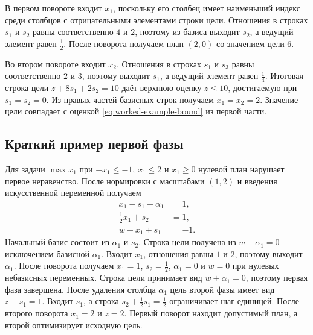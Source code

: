 В первом повороте входит $x_1$, поскольку его столбец имеет
наименьший индекс среди столбцов с отрицательными элементами строки
цели. Отношения в строках $s_1$ и $s_2$ равны соответственно $4$ и $2$,
поэтому из базиса выходит $s_2$, а ведущий элемент равен $\tfrac12$.
После поворота получаем план $(2,0)$ со значением цели $6$.

Во втором повороте входит $x_2$. Отношения в строках $s_1$ и $s_3$
равны соответственно $2$ и $3$, поэтому выходит $s_1$, а ведущий
элемент равен $\tfrac14$. Итоговая строка цели
$z+8s_1+2s_2=10$ даёт верхнюю оценку $z\leq10$, достигаемую
при $s_1=s_2=0$. Из правых частей базисных строк получаем
$x_1=x_2=2$. Значение цели совпадает с оценкой
\eqref{eq:worked-example-bound} из первой части.

\subsection{Краткий пример первой фазы}

Для задачи $\max x_1$ при $-x_1\leq-1$, $x_1\leq2$ и $x_1\geq0$
нулевой план нарушает первое неравенство. После нормировки с
масштабами $(1,2)$ и введения искусственной переменной получаем
\begin{equation}
  \begin{aligned}
    x_1-s_1+\alpha_1&=1,\\
    \tfrac12 x_1+s_2&=1,\\
    w-x_1+s_1&=-1 .
  \end{aligned}
  \label{eq:simplex-phase-one-example}
\end{equation}
Начальный базис состоит из $\alpha_1$ и $s_2$. Строка цели получена
из $w+\alpha_1=0$ исключением базисной $\alpha_1$. Входит $x_1$,
отношения равны $1$ и $2$, поэтому выходит $\alpha_1$. После поворота
получаем $x_1=1$, $s_2=\tfrac12$, $\alpha_1=0$ и $w=0$ при нулевых
небазисных переменных. Строка цели принимает вид $w+\alpha_1=0$,
поэтому первая фаза завершена. После удаления столбца $\alpha_1$
цель второй фазы имеет вид $z-s_1=1$. Входит $s_1$, а строка
$s_2+\tfrac12s_1=\tfrac12$ ограничивает шаг единицей. После второго
поворота $x_1=2$ и $z=2$. Первый поворот находит допустимый план,
а второй оптимизирует исходную цель.
